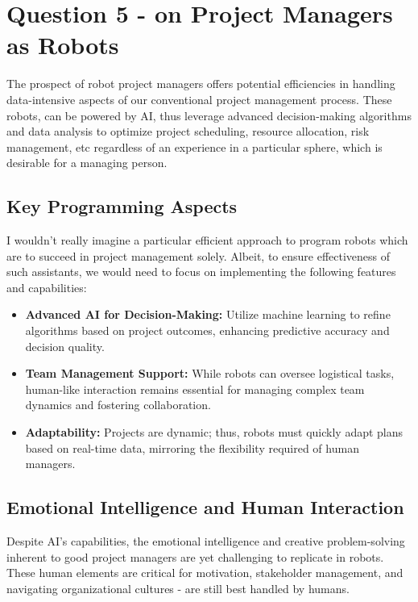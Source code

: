 \documentclass[12pt,a4paper]{article}
\begin{document}
\section{Question 5 - on Project Managers as Robots}

The prospect of robot project managers offers potential efficiencies in handling data-intensive aspects of our conventional project management process. These robots, can be powered by AI, thus leverage advanced decision-making algorithms and data analysis to optimize project scheduling, resource allocation, risk management, etc regardless of an experience in a particular sphere, which is desirable for a managing person.

\subsection{Key Programming Aspects}

I wouldn't really imagine a particular efficient approach to program robots which are to succeed in project management solely. Albeit, to ensure effectiveness of such assistants, we would need to focus on implementing the following features and capabilities:
\begin{itemize}
	\item \textbf{Advanced AI for Decision-Making:} Utilize machine learning to refine algorithms based on project outcomes, enhancing predictive accuracy and decision quality.
	\item \textbf{Team Management Support:} While robots can oversee logistical tasks, human-like interaction remains essential for managing complex team dynamics and fostering collaboration.
	\item \textbf{Adaptability:} Projects are dynamic; thus, robots must quickly adapt plans based on real-time data, mirroring the flexibility required of human managers.
\end{itemize}

\subsection{Emotional Intelligence and Human Interaction}

Despite AI's capabilities, the emotional intelligence and creative problem-solving inherent to good project managers are yet challenging to replicate in robots. These human elements are critical for motivation, stakeholder management, and navigating organizational cultures - are still best handled by humans.
\end{document}
